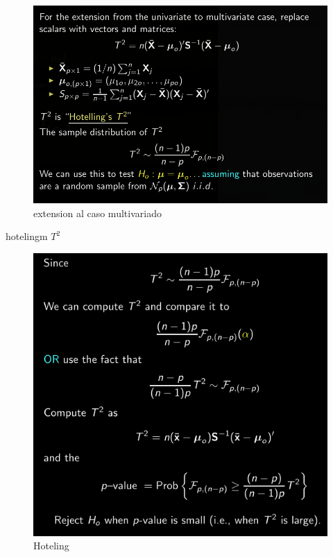 \documentclass[10pt,a4paper]{article} %
\begin{document}
        \begin{figure}[h!]
            \centering
            \includegraphics[width=0.8\linewidth]{exten.png}
            \caption{extension al caso multivariado}
            \label{extension al caso multivariado}
        \end{figure}

        hotelingm   $ T ^{2}   $
        \begin{figure}[h!]
            \centering
            \includegraphics[width=0.8\linewidth]{hoteling.png}
            \caption{Hoteling}
            \label{joteling}
        \end{figure}
\end{document}
